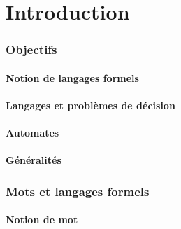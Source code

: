 
\begingroup

\part{Introduction}
 
 
\section{Objectifs}

\subsection{Notion de langages formels}




 
\subsection{Langages et problèmes de décision}




 
\subsection{Automates}


 
\subsection{Généralités} 


 
 
 
\section{Mots et langages formels}
 
\subsection{Notion de mot}







 
